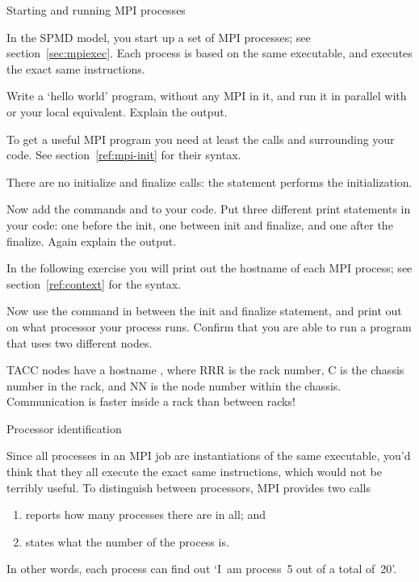  {Starting and running MPI processes}

In the \ac{SPMD} model, you start up a set of MPI processes; see section~\ref{sec:mpiexec}.
Each process is based on the same executable, and executes the exact same instructions.

\begin{exercise}
  \label{ex:hello1}
  Write a `hello world' program, without any MPI in it,
  and run it in parallel with  or your local equivalent. Explain the output.
\end{exercise}

To get a useful MPI program you need at least the calls 
and  surrounding your code. See section~\ref{ref:mpi-init}
for their syntax.
\begin{pythonnote}
  There are no initialize and finalize calls: the  statement
  performs the initialization.
\end{pythonnote}

\begin{exercise}
  \label{ex:hello2}
  Now add the commands  and 
  to your code. Put three different print statements in your code: one before the init,
  one between init and finalize, and one after the finalize. Again explain the output.
\end{exercise}

In the following exercise you will print out the hostname
of each MPI process; see section~\ref{ref:context} for the syntax.
\begin{exercise}
  \label{ex:procname}
  Now use the command 
  in between the
  init and finalize statement, and print out on what processor your process runs.
  Confirm that you are able to run a program that uses two different nodes.

\begin{tacc}
TACC nodes have a hostname , where RRR is the rack number, C is the chassis
number in the rack, and NN is the node number within the chassis. Communication
is faster inside a rack than between racks!
\end{tacc}
\end{exercise}

 {Processor identification}

Since all processes in an MPI job are instantiations of the same executable,
you'd think that they all execute the exact same instructions,
which would not be terribly useful.
To distinguish between processors, MPI provides two calls
\begin{enumerate}
\item {} reports how many processes there are in all; and
\item {} states what the number of the process is.
\end{enumerate}
In other words, each process can find out `I~am process~5
out of a total of~20'.

